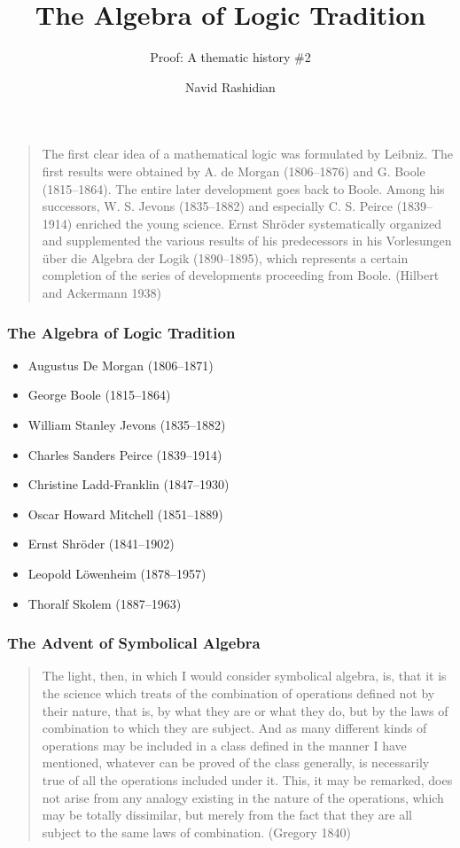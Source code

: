 \documentclass[compress,12pt]{beamer}
\title{The Algebra of Logic Tradition}
\subtitle{Proof: A thematic history \#2}
\date{}
\author{Navid Rashidian}
\institute{University of Tehran}
\begin{document}
\frame[plain]{\titlepage}


\begin{frame}
    \begin{quote}
        The first clear idea of a mathematical logic was formulated by Leibniz. The first results were obtained by A. de Morgan (1806--1876) and G. Boole (1815--1864). The entire later development goes back to Boole. Among his successors, W. S. Jevons (1835--1882) and especially C. S. Peirce (1839--1914) enriched the young science. Ernst Shr\"oder systematically organized and supplemented the various results of his predecessors in his \textup{Vorlesungen \"uber die Algebra der Logik} (1890--1895), which represents a certain completion of the series of developments proceeding from Boole. (Hilbert and Ackermann 1938)
    \end{quote}
\end{frame}

\begin{frame}
    \frametitle{The Algebra of Logic Tradition}
    \begin{itemize}
        \item Augustus De Morgan (1806--1871)
        \item George Boole (1815--1864)
        \item William Stanley Jevons (1835--1882)
        \item Charles Sanders Peirce (1839--1914)
        \item Christine Ladd-Franklin (1847--1930)
        \item Oscar Howard Mitchell (1851--1889)
        \item Ernst Shr\"oder (1841--1902)
        \item Leopold L\"owenheim (1878--1957)
        \item Thoralf Skolem (1887--1963)
    \end{itemize}
\end{frame}

\begin{frame}
    \frametitle{The Advent of Symbolical Algebra}
    \begin{quote}
        The light, then, in which I would consider symbolical algebra, is, that it is
        the science which treats of the combination of operations defined not by their
        nature, that is, by what they are or what they do, but by the laws of combination
        to which they are subject. And as many different kinds of operations may be
        included in a class defined in the manner I have mentioned, whatever can be
        proved of the class generally, is necessarily true of all the operations included
        under it. This, it may be remarked, does not arise from any analogy existing
        in the nature of the operations, which may be totally dissimilar, but merely from
        the fact that they are all subject to the same laws of combination. (Gregory 1840)
    \end{quote}
\end{frame}
\end{document}
